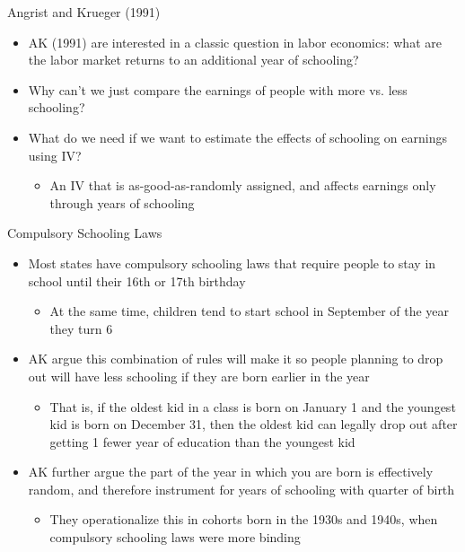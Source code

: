 \documentclass[11pt,notes=hide,aspectratio=169,mathserif]{beamer}
\begin{document}
\begin{frame}{Angrist and Krueger (1991)}
\begin{itemize}
  \item AK (1991) are interested in a classic question in labor economics:
  what are the labor market returns to an additional year of schooling?
  \item Why can’t we just compare the earnings of people with more vs. less
  schooling? 
  \item What do we need if we want to estimate the effects of schooling on
  earnings using IV? \pause
  \begin{itemize}
    \item An IV that is as-good-as-randomly assigned,
    and affects earnings only through years of schooling
  \end{itemize}
\end{itemize}
\end{frame}
\begin{frame}{Compulsory Schooling Laws}
\begin{itemize}
  \item Most states have compulsory schooling laws that require people to
  stay in school until their 16th or 17th birthday
  \begin{itemize}
    \item At the same time, children tend to start school in September of the
    year they turn 6
  \end{itemize}
  \item AK argue this combination of rules will make it so people planning to
  drop out will have less schooling if they are born earlier in the year
  \begin{itemize}
    \item That is, if the oldest kid in a class is born on January 1 and the
    youngest kid is born on December 31, then the oldest kid can legally
    drop out after getting 1 fewer year of education than the youngest kid
  \end{itemize}
  \item AK further argue the part of the year in which you are born is
  effectively random, and therefore instrument for years of schooling
  with quarter of birth
  \begin{itemize}
    \item They operationalize this in cohorts born in the 1930s and 1940s, when
    compulsory schooling laws were more binding
  \end{itemize}
\end{itemize}
\end{frame}
\end{document}
